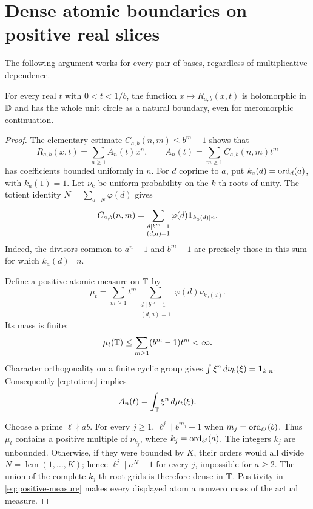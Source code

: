 \section{Dense atomic boundaries on positive real slices}
\label{sec:slices}

The following argument works for every pair of bases, regardless of
multiplicative dependence.

\begin{proposition}\label{prop:slice}
For every real \(t\) with \(0<t<1/b\), the function
\(x\mapsto R_{a,b}(x,t)\) is holomorphic in \(\mathbb D\) and has the
whole unit circle as a natural boundary, even for meromorphic
continuation.
\end{proposition}

\begin{proof}
The elementary estimate \(C_{a,b}(n,m)\leq b^m-1\) shows that
\[
R_{a,b}(x,t)=\sum_{n\geq1}A_n(t)x^n,\qquad
A_n(t)=\sum_{m\geq1}C_{a,b}(n,m)t^m
\]
has coefficients bounded uniformly in \(n\).
For \(d\) coprime to \(a\), put \(k_a(d)=\operatorname{ord}_d(a)\), with
\(k_a(1)=1\). Let \(\nu_k\) be uniform probability on the \(k\)-th
roots of unity. The totient identity
\(N=\sum_{d\mid N}\varphi(d)\) gives
\begin{equation}\label{eq:totient}
C_{a,b}(n,m)=
\sum_{\substack{d\mid b^m-1\\(d,a)=1}}
\varphi(d)\mathbf 1_{k_a(d)\mid n}.
\end{equation}
Indeed, the divisors common to \(a^n-1\) and \(b^m-1\) are precisely
those in this sum for which \(k_a(d)\mid n\).

Define a positive atomic measure on \(\mathbb T\) by
\begin{equation}\label{eq:positive-measure}
\mu_t=\sum_{m\geq1}t^m
\sum_{\substack{d\mid b^m-1\\(d,a)=1}}
\varphi(d)\nu_{k_a(d)}.
\end{equation}
Its mass is finite:
\[
\mu_t(\mathbb T)\leq\sum_{m\geq1}(b^m-1)t^m<\infty.
\]
Character orthogonality on a finite cyclic group gives
\(\int\xi^n\,d\nu_k(\xi)=\mathbf 1_{k\mid n}\).
Consequently \eqref{eq:totient} implies
\[
A_n(t)=\int_{\mathbb T}\xi^n\,d\mu_t(\xi).
\]

Choose a prime \(\ell\nmid ab\). For every \(j\geq1\),
\(\ell^j\mid b^{m_j}-1\) when \(m_j=\operatorname{ord}_{\ell^j}(b)\).
Thus \(\mu_t\) contains a positive multiple of
\(\nu_{k_j}\), where \(k_j=\operatorname{ord}_{\ell^j}(a)\).
The integers \(k_j\) are unbounded. Otherwise, if they were bounded
by \(K\), their orders would all divide
\(N=\operatorname{lcm}(1,\ldots,K)\); hence
\(\ell^j\mid a^N-1\) for every \(j\), impossible for \(a\geq2\).
The union of the complete \(k_j\)-th root grids is therefore dense
in \(\mathbb T\). Positivity in \eqref{eq:positive-measure} makes every
displayed atom a nonzero mass of the actual measure.


\end{proof}
